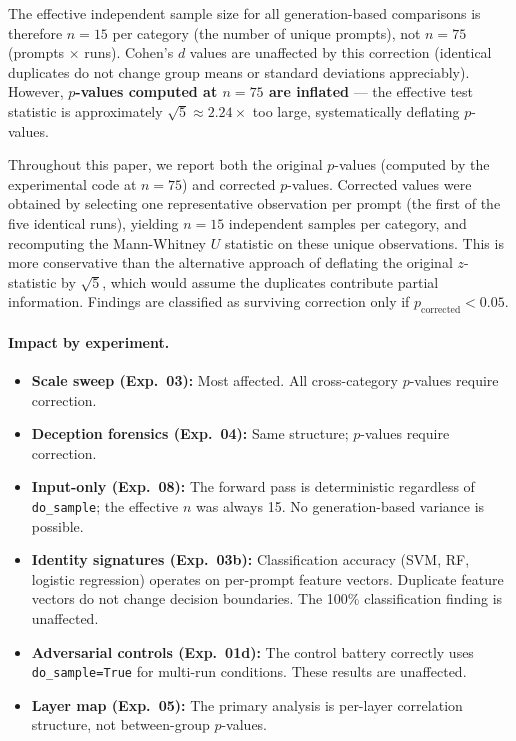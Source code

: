 \documentclass[11pt,a4paper]{article}
\begin{document}
The effective independent sample size for all generation-based comparisons is therefore $n = 15$ per category (the number of unique prompts), not $n = 75$ (prompts $\times$ runs). Cohen's $d$ values are unaffected by this correction (identical duplicates do not change group means or standard deviations appreciably). However, \textbf{$p$-values computed at $n = 75$ are inflated} --- the effective test statistic is approximately $\sqrt{5} \approx 2.24 \times$ too large, systematically deflating $p$-values.

Throughout this paper, we report both the original $p$-values (computed by the experimental code at $n = 75$) and corrected $p$-values. Corrected values were obtained by selecting one representative observation per prompt (the first of the five identical runs), yielding $n = 15$ independent samples per category, and recomputing the Mann-Whitney $U$ statistic on these unique observations. This is more conservative than the alternative approach of deflating the original $z$-statistic by $\sqrt{5}$, which would assume the duplicates contribute partial information. Findings are classified as surviving correction only if $p_{\text{corrected}} < 0.05$.

\paragraph{Impact by experiment.}
\begin{itemize}[leftmargin=*]
    \item \textbf{Scale sweep (Exp.\ 03):} Most affected. All cross-category $p$-values require correction.
    \item \textbf{Deception forensics (Exp.\ 04):} Same structure; $p$-values require correction.
    \item \textbf{Input-only (Exp.\ 08):} The forward pass is deterministic regardless of \texttt{do\_sample}; the effective $n$ was always 15. No generation-based variance is possible.
    \item \textbf{Identity signatures (Exp.\ 03b):} Classification accuracy (SVM, RF, logistic regression) operates on per-prompt feature vectors. Duplicate feature vectors do not change decision boundaries. The 100\% classification finding is unaffected.
    \item \textbf{Adversarial controls (Exp.\ 01d):} The control battery correctly uses \texttt{do\_sample=True} for multi-run conditions. These results are unaffected.
    \item \textbf{Layer map (Exp.\ 05):} The primary analysis is per-layer correlation structure, not between-group $p$-values.
\end{itemize}
\end{document}
